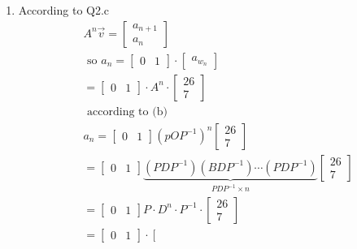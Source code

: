 \documentclass[11pt]{article}
\begin{document}
\begin{enumerate}[{\bf Q1.}]
\begin{enumerate}
			\item 
			According to Q2.c
			$$
			\begin{aligned}
			& A^n \vec{v}=\left[\begin{array}{l}
			a_{n+1} \\
			a_n
			\end{array}\right] \\
			& \text { so } a_n=\left[\begin{array}{ll}
			0 & 1
			\end{array}\right] \cdot\left[\begin{array}{c}
			a_{w_n}
			\end{array}\right] \\
			& =\left[\begin{array}{ll}
			0 & 1
			\end{array}\right] \cdot A^n \cdot\left[\begin{array}{c}
			26 \\
			7
			\end{array}\right] \\
			& \text { according to (b) } \\
			& a_n=\left[\begin{array}{ll}
			0 & 1
			\end{array}\right]\left(p O P^{-1}\right)^n\left[\begin{array}{c}
			26 \\
			7
			\end{array}\right] \\
			& =\left[\begin{array}{ll}
			0 & 1
			\end{array}\right] \underbrace{\left(P D P^{-1}\right)\left(B D P^{-1}\right) \cdots\left(P D P^{-1}\right)}_{P D P^{-1} \times n}\left[\begin{array}{c}
			26 \\
			7
			\end{array}\right] \\
			& =\left[\begin{array}{ll}
			0 & 1
			\end{array}\right] P \cdot D^n \cdot P^{-1} \cdot\left[\begin{array}{c}
			26 \\
			7
			\end{array}\right] \\
			& =\left[\begin{array}{ll}
			0 & 1
			\end{array}\right] \cdot\left[\begin{array}{ll}

\end{array}
\end{aligned}$$
\end{enumerate}
\end{enumerate}
\end{document}
